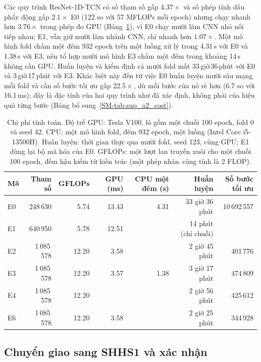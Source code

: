 \documentclass[11pt,a4paper]{article}
\begin{document}
Các quy trình ResNet-1D-TCN có số tham số gấp $4.37\times$ và số phép tính dấu phẩy động gấp $2.1\times$ E0
(122 so với 57 MFLOPs mỗi epoch) nhưng chạy nhanh hơn $3.76\times$ trong phép đo GPU (Bảng~\ref{tab:cost}),
vì E0 chạy mười lăm CNN nhỏ nối tiếp nhau; E1, vẫn giữ mười lăm nhánh CNN, chỉ nhanh hơn $1.07\times$. Một mô hình fold chấm một
đêm 932 epoch trên một luồng xử lý trong 4.31\,s với E0 và 1.38\,s với E3, nên tổ hợp mười mô hình E3 chấm một
đêm trong khoảng 14\,s không cần GPU. Huấn luyện và kiểm định cả mười fold mất 33\,giờ\,36\,phút với E0 và
3\,giờ\,17\,phút với E3. Khác biệt này đến từ việc E0 huấn luyện mười sáu mạng mỗi fold và cần số bước tối ưu
gấp $22.5\times$, dù mỗi bước của nó rẻ hơn (6.7 so với 16.1\,ms); đây là đặc tính của hai quy trình như đã
xác định, không phải của hiệu quả từng bước (Bảng bổ sung~\ref{SM-tab:sup_a2_cost}).

\begin{table}[H]
\centering
\caption{Chi phí tính toán. Độ trễ GPU: Tesla V100, lô gồm một chuỗi 100 epoch, fold 0 và seed 42. CPU: một mô
hình fold, đêm 932 epoch, một luồng (Intel Core i5-13500H). Huấn luyện: thời gian thực qua mười fold, seed
123, cùng GPU; E1 dùng lại bộ mã hóa của E0. GFLOPs: một lượt lan truyền xuôi cho một chuỗi 100 epoch, đếm
hậu kiểm từ kiến trúc (một phép nhân--cộng tính là 2 FLOP).}
\label{tab:cost}
\small
\begin{tabular}{lrrrrrr}
\toprule
\textbf{Mã} & \textbf{Tham số} & \textbf{GFLOPs} & \textbf{GPU (ms)} & \textbf{CPU một đêm (s)} & \textbf{Huấn luyện} & \textbf{Số bước tối ưu} \\
\midrule
E0 & 248\,630 & 5.74 & 13.43 & 4.31 & 33 giờ 36 phút & 10\,692\,557 \\
E1 & 640\,950 & 5.78 & 12.51 & & 14 phút (chỉ chuỗi) & \\
E2 & 1\,085\,578 & 12.20 & 3.58 & & 2 giờ 45 phút & 401\,776 \\
E3 & 1\,085\,578 & 12.20 & 3.57 & 1.38 & 3 giờ 17 phút & 474\,809 \\
E4 & 1\,085\,578 & 12.20 & & & 2 giờ 56 phút & 425\,612 \\
E6 & 1\,085\,578 & 12.20 & 3.58 & & 2 giờ 25 phút & 344\,928 \\
\bottomrule
\end{tabular}
\end{table}

\subsection{Chuyển giao sang SHHS1 và xác nhận}
\label{sec:holdout}
\end{document}
